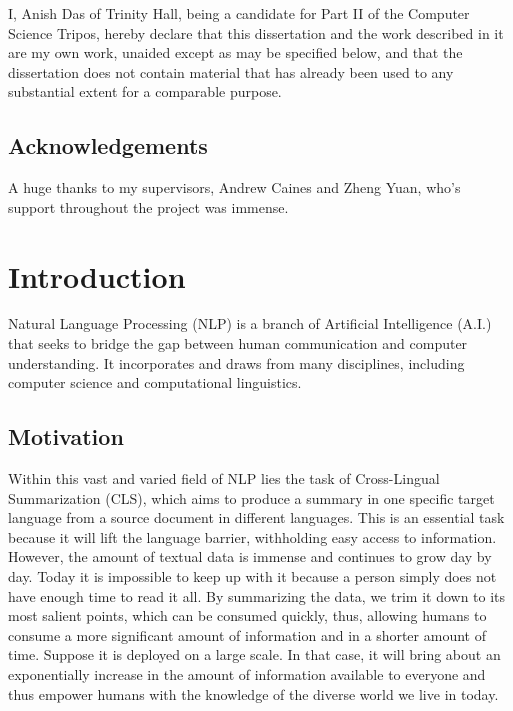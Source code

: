 \documentclass[12pt,a4paper,twoside,openright]{report}
\begin{document}
I, Anish Das of Trinity Hall, being a candidate for Part II of the Computer Science Tripos, hereby declare
that this dissertation and the work described in it are my own work,
unaided except as may be specified below, and that the dissertation
does not contain material that has already been used to any substantial
extent for a comparable purpose.

\bigskip
{}

\medskip
{}

\bigskip
\section*{Acknowledgements}

A huge thanks to my supervisors, Andrew Caines and Zheng Yuan, who's support throughout the project was immense.


\tableofcontents

\listoffigures
\listoftables




\pagestyle{headings}

\cleardoublepage{}

\chapter{Introduction}
\label{intro}


Natural Language Processing (NLP) is a branch of Artificial Intelligence (A.I.) that seeks to bridge the gap between human communication and computer understanding. It incorporates and draws from many disciplines, including computer science and computational linguistics.

\section{Motivation}
\label{motivation}

Within this vast and varied field of NLP lies the task of Cross-Lingual Summarization (CLS), which aims to produce a summary in one specific target language from a source document in different languages. This is an essential task because it will lift the language barrier, withholding easy access to information. However, the amount of textual data is immense and continues to grow day by day. Today it is impossible to keep up with it because a person simply does not have enough time to read it all. By summarizing the data, we trim it down to its most salient points, which can be consumed quickly, thus, allowing humans to consume a more significant amount of information and in a shorter amount of time.  Suppose it is deployed on a large scale. In that case, it will bring about an exponentially increase in the amount of information available to everyone and thus empower humans with the knowledge of the diverse world we live in today.
\end{document}
